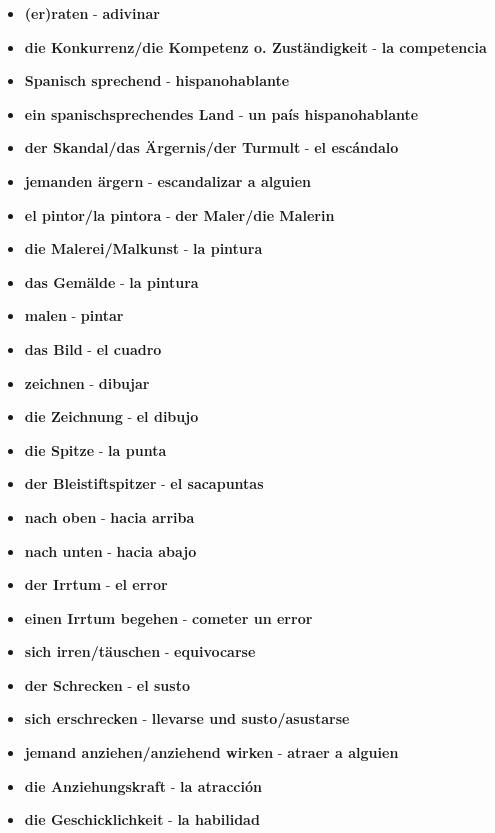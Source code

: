 \documentclass{article}
\begin{document}
\begin{multicols}{2}
\begin{itemize}
\begin{itemize}
		\end{itemize}
	\end{itemize}
	\begin{itemize}
		\item{\textbf{(er)raten} - \textbf{adivinar}}
		\item{\textbf{die Konkurrenz/die Kompetenz o. Zuständigkeit} - \textbf{la competencia}}
		\item{\textbf{Spanisch sprechend} - \textbf{hispanohablante}}
		\item{\textbf{ein spanischsprechendes Land} - \textbf{un país hispanohablante}}
		\item{\textbf{der Skandal/das Ärgernis/der Turmult} - \textbf{el escándalo}}
		\item{\textbf{jemanden ärgern} - \textbf{escandalizar a alguien}}
		\item{\textbf{el pintor/la pintora} - \textbf{der Maler/die Malerin}}
		\item{\textbf{die Malerei/Malkunst} - \textbf{la pintura}}
		\item{\textbf{das Gemälde} - \textbf{la pintura}}
		\item{\textbf{malen} - \textbf{pintar}}
		\item{\textbf{das Bild} - \textbf{el cuadro}}
		\item{\textbf{zeichnen} - \textbf{dibujar}}
		\item{\textbf{die Zeichnung} - \textbf{el dibujo}}
		\item{\textbf{die Spitze} - \textbf{la punta}}
		\item{\textbf{der Bleistiftspitzer} - \textbf{el sacapuntas}}
		\item{\textbf{nach oben} - \textbf{hacia arriba}}
		\item{\textbf{nach unten} - \textbf{hacia abajo}}
		\item{\textbf{der Irrtum} - \textbf{el error}}
		\item{\textbf{einen Irrtum begehen} - \textbf{cometer un error}}
		\item{\textbf{sich irren/täuschen} - \textbf{equivocarse}}
		\item{\textbf{der Schrecken} - \textbf{el susto}}
		\item{\textbf{sich erschrecken} - \textbf{llevarse und susto/asustarse}}
		\item{\textbf{jemand anziehen/anziehend wirken} - \textbf{atraer a alguien}}
		\item{\textbf{die Anziehungskraft} - \textbf{la atracción}}
		\item{\textbf{die Geschicklichkeit} - \textbf{la habilidad}}

\end{itemize}
\end{multicols}
\end{document}
